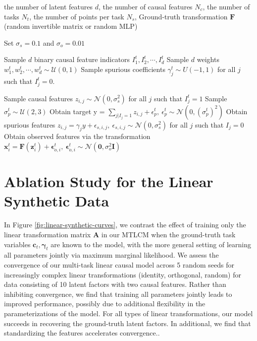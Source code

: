 \documentclass[10pt]{article} %
\theoremstyle{plain}
\theoremstyle{definition}
\begin{document}
\begin{algorithm}[t]
    \begin{algorithmic}
        \REQUIRE the number of latent features $d$, the number of causal features $N_c$, the number of tasks $N_t$, the number of points per task $N_s$, Ground-truth transformation $\mathbf{F}$ (random invertible matrix or random MLP)

        \STATE Set $\sigma_s = 0.1$ and $\sigma_o=0.01$
        
	    \STATE Sample $d$ binary causal feature indicators $I_1^t, I_2^t, \cdots, I_d^t$
        \STATE Sample $d$ weights $w_1^t,w_2^t,\cdots,w_d^t\sim\mathcal{U}(0,1)$
        \STATE Sample spurious coefficients $\gamma_j^t\sim U(-1, 1)$ for all $j$ such that $I_j^t=0$.
        
        
        \STATE Sample causal features $z_{i,j} \sim \mathcal{N}(0, \sigma_s^2)$ for all $j$ such that $I_j^t = 1$
        \STATE Sample $\sigma_p^t \sim \mathcal{U}(2, 3)$ 
	\STATE Obtain target y = $\sum_{j | I_j = 1} z_{i,j} + \epsilon_p^t, ~\epsilon_p^t\sim \mathcal{N}(0, (\sigma_p^t)^2)$
	\STATE Obtain spurious features $z_{i,j} = \gamma_j  y + \epsilon_{s,i,j},~\epsilon_{s,i,j}\sim\mathcal{N}(0,\sigma_s^2)$ for all $j$ such that $I_j = 0$
        \STATE Obtain observed features via the transformation $\mathbf{x}_i^t = \mathbf{F}(\mathbf{z}_i^t) + \boldsymbol{\epsilon}_{o,i}^{t},~ \boldsymbol{\epsilon}_{o,i}^{t}\sim\mathcal{N}(\mathbf{0},\sigma_o^2\mathbf{I})$
        \ENDFOR
        \ENDFOR
    \end{algorithmic}
    \caption{Pseudocode for the data generating process in the synthetic data experiments}
    \label{alg:data-gen}
\end{algorithm}


\section{Ablation Study for the Linear Synthetic Data}\label{appendix:ablation study lin syn}

In Figure \ref{fig:linear-synthetic-curves}, we contrast the 
effect of training only the linear transformation matrix $\mathbf{A}$ in our MTLCM when the ground-truth task variables $\mathbf{c}_t,\boldsymbol{\gamma}_t$ are known to the model, with the more general setting of learning all parameters jointly via maximum marginal likelihood. We assess the convergence of our multi-task linear causal model across 5 random seeds for increasingly complex 
linear transformations (identity, orthogonal, random) for data consisting of 10 latent factors with two causal features. Rather than
inhibiting convergence, we find that training all parameters jointly leads to improved performance, possibly due to additional flexibility in the parameterizations of the model. For all types of linear transformations, our model succeeds in recovering the ground-truth latent factors. In additional, we find that standardizing the features accelerates convergence..
\end{document}
